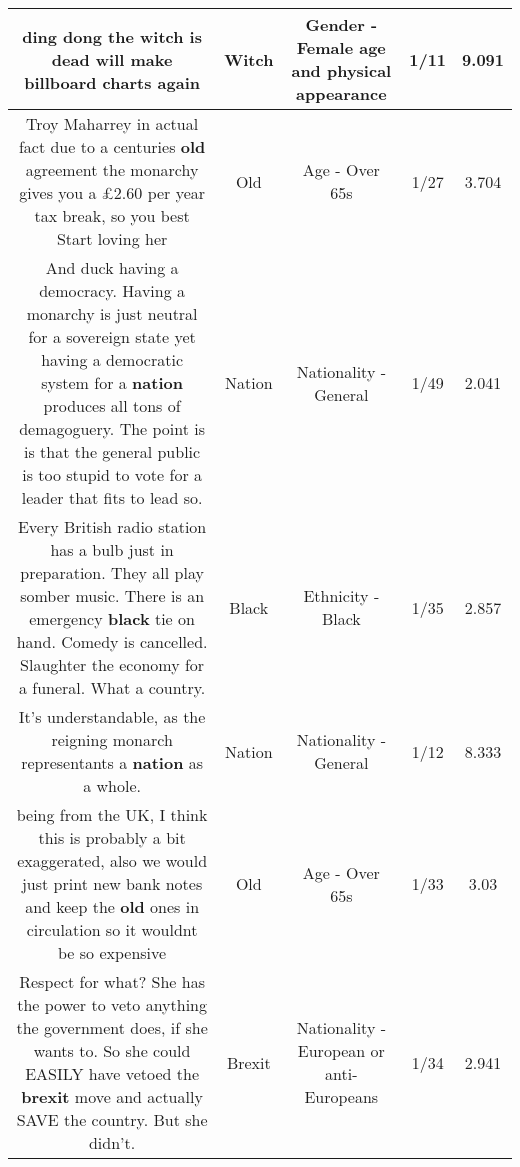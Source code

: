 \documentclass[11pt]{article}
\newlength\mylength
\begin{document}
\begin{center}
\begin{longtable}{|C{.65\mylength}|C{.30\mylength}|C{.12\mylength}|C{.12\mylength}|C{.12\mylength}|}
  \small ding dong the \textbf{witch} is dead will make billboard charts again\normalsize   & Witch & Gender - Female age and physical appearance & 1/11 & 9.091 \\  \hline
  \small Troy Maharrey in actual fact due to a centuries \textbf{old} agreement the monarchy gives you a £2.60 per year tax break, so you best Start loving her\normalsize   & Old & Age - Over 65s & 1/27 & 3.704 \\  \hline
  \small And duck having a democracy. Having a monarchy is just neutral for a sovereign state yet having a democratic system for a \textbf{nation} produces all tons of demagoguery. The point is is that the general public is too stupid to vote for a leader that fits to lead so.\normalsize   & Nation & Nationality - General & 1/49 & 2.041 \\  \hline
  \small Every British radio station has a bulb just in preparation. They all play somber music. There is an emergency \textbf{black} tie on hand. Comedy is cancelled. Slaughter the economy for a funeral. What a country.\normalsize   & Black & Ethnicity - Black & 1/35 & 2.857 \\  \hline
  \small It's understandable, as the reigning monarch representants a \textbf{nation} as a whole.\normalsize   & Nation & Nationality - General & 1/12 & 8.333 \\  \hline
  \small being from the UK, I think this is probably a bit exaggerated, also we would just print new bank notes and keep the \textbf{old} ones in circulation so it wouldnt be so expensive\normalsize   & Old & Age - Over 65s & 1/33 & 3.03 \\  \hline
  \small Respect for what? She has the power to veto anything the government does, if she wants to. So she could EASILY have vetoed the \textbf{brexit} move and actually SAVE the country. But she didn't.\normalsize   & Brexit & Nationality - European or anti-Europeans & 1/34 & 2.941 \\  \hline

\end{longtable}
\end{center}
\end{document}
